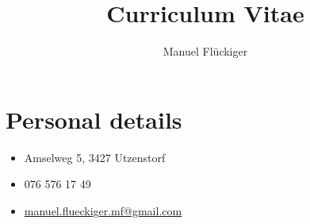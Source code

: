 \documentclass{article}
\renewcommand{\maketitle}{
    \begin{center}
    {\huge\bfseries
    \theauthor}
    \end{center}
}
\begin{document}
\selectfont


\title{Curriculum Vitae}
\author{Manuel Fl\"uckiger}

\maketitle
\section{Personal details}
\begin{itemize}[parsep = 0.05cm]
    \item[] Amselweg 5, 3427 Utzenstorf
    \item[] 076 576 17 49
    \item[]\href{mailto:manuel.flueckiger.mf@gmail.com}{manuel.flueckiger.mf@gmail.com}
\end{itemize}
\end{document}

